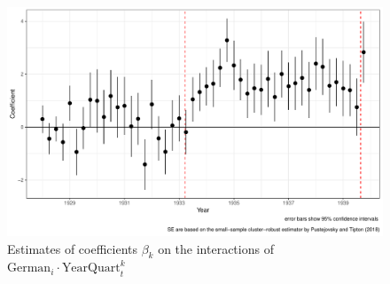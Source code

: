\begin{figure}[h]
\centering
\includegraphics[width=\textwidth]{plots/effects/quarterly/until_pact/pointrange_robust.pdf}
\caption{Estimates of coefficients $\beta_k$ on the interactions of $\text{German}_{i} \cdot \text{YearQuart}_{t}^k$}
\label{fig:did_effets}
\end{figure}

